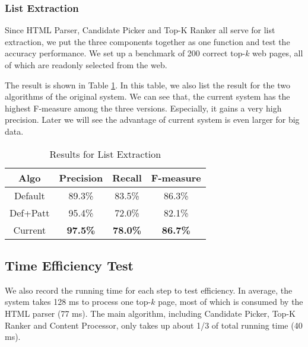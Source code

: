 \subsubsection{List Extraction}

\label{sec:evalList}

Since HTML Parser, Candidate Picker and Top-K Ranker all serve for list extraction,
we put the three components together as one function and test the accuracy performance.
We set up a benchmark of 200 correct top-$k$ web pages,
all of which are readonly selected from the web.


The result is shown in Table \ref{tab:listRes}.
In this table, we also list the result for the two algorithms of the original system\cite{ZZX2012KDD}.
We can see that, the current system has the highest F-measure among the three versions.
Especially, it gains a very high precision.
Later we will see the advantage of current system is even larger for big data.

\begin{table}
\centering
\caption{Results for List Extraction}
\begin{tabular}{|c||c|c|c|}
\hline
Algo  & Precision & Recall & F-measure\\\hline
Default  & 89.3\% & 83.5\% & 86.3\% \\
Def+Patt  & 95.4\% & 72.0\% & 82.1\% \\
Current  & \textbf{97.5\%} & \textbf{78.0\%} & \textbf{86.7\%}\\
\hline
\end{tabular}

\label{tab:listRes}
\end{table}

\subsection{Time Efficiency Test}

We also record the running time for each step to test efficiency.
In average, the system takes 128 ms to process one top-$k$ page,
most of which is consumed by the HTML parser (77 ms). The main algorithm,
including Candidate Picker, Top-K Ranker and Content Processor,
only takes up about 1/3 of total running time (40 ms).

